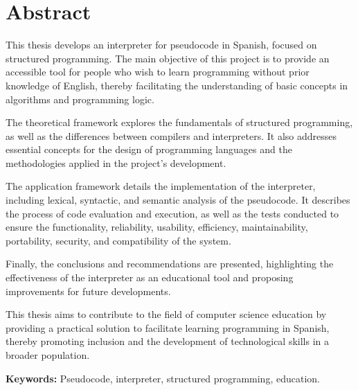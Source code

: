 \chapter*{Abstract}

This thesis develops an interpreter for pseudocode in Spanish, focused on structured programming. The main objective of this project is to provide an accessible tool for people who wish to learn programming without prior knowledge of English, thereby facilitating the understanding of basic concepts in algorithms and programming logic.

The theoretical framework explores the fundamentals of structured programming, as well as the differences between compilers and interpreters. It also addresses essential concepts for the design of programming languages and the methodologies applied in the project's development.

The application framework details the implementation of the interpreter, including lexical, syntactic, and semantic analysis of the pseudocode. It describes the process of code evaluation and execution, as well as the tests conducted to ensure the functionality, reliability, usability, efficiency, maintainability, portability, security, and compatibility of the system.

Finally, the conclusions and recommendations are presented, highlighting the effectiveness of the interpreter as an educational tool and proposing improvements for future developments.

This thesis aims to contribute to the field of computer science education by providing a practical solution to facilitate learning programming in Spanish, thereby promoting inclusion and the development of technological skills in a broader population.

\textbf{Keywords:} Pseudocode, interpreter, structured programming, education.
